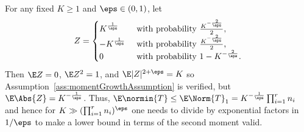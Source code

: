 \documentclass[11pt,a4paper]{article}
\begin{document}
\begin{example}
    For any fixed $K\ge 1$ and $\eps\in (0,1)$, let 
    \[
        Z = \begin{cases}K^{\frac 1\eps} & \text{ with probability $\frac{K^{-\frac 2\eps}} 2$,}\\
        -K^{\frac 1 \eps} & \text{ with probability $\frac{K^{-\frac 2\eps}} 2$,}\\
        0 & \text{ with probability $1-{K^{-\frac 2\eps}}$.}
        \end{cases}
    \]
    Then $\E Z=0$, $\E Z^2=1$, and $\E |Z|^{2+\eps}=K$ so Assumption~\ref{ass:momentGrowthAssumption} is verified, but $\E \Abs{Z} = K^{-\frac 1 \eps}$. Thus, $\E \normin{T} \leq \E \Norm{T}_1 =   K^{-\frac 1 \eps} \prod_{i=1}^r n_i$ and hence for $K \gg (\prod_{i=1}^r n_i)^{\eps}$ one needs to divide by exponential factors in $1/\eps$ to make a lower bound in terms of the second moment valid.
\end{example}
\end{document}
